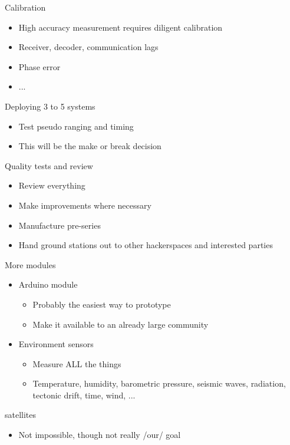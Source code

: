 	\begin{frame}{Calibration}
		\begin{itemize}
			\item High accuracy measurement requires diligent calibration
			\item Receiver, decoder, communication lags
			\item Phase error
			\item ...
		\end{itemize}
	\end{frame}
	\begin{frame}{Deploying 3 to 5 systems}
		\begin{itemize}
			\item Test pseudo ranging and timing
			\item This will be the make or break decision
		\end{itemize}
	\end{frame}
	\begin{frame}{Quality tests and review}
		\begin{itemize}
			\item Review everything
			\item Make improvements where necessary
			\item Manufacture pre-series
			\item Hand ground stations out to other hackerspaces and interested parties
		\end{itemize}
	\end{frame}
	\begin{frame}{More modules}
		\begin{itemize}
			\item Arduino module
			\begin{itemize}
				\item Probably the easiest way to prototype
				\item Make it available to an already large community
			\end{itemize}
			\item Environment sensors
			\begin{itemize}
				\item Measure ALL the things
				\item Temperature, humidity, barometric pressure, seismic waves, radiation, tectonic drift, time, wind, ...
			\end{itemize}
		\end{itemize}
	\end{frame}
	\begin{frame}{satellites}
		\begin{itemize}
			\item Not impossible, though not really /our/ goal
		\end{itemize}
	\end{frame}

